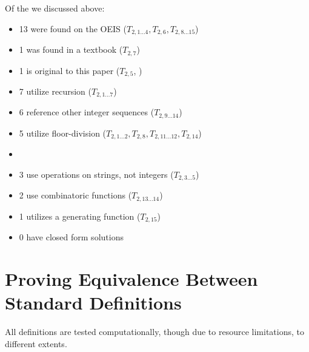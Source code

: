 \documentclass[conference]{IEEEtran}
\begin{document}
Of the \TotalOriginals {} we discussed above:
\begin{itemize}
    \item 13 were found on the OEIS \cite{OEIS-TMS, OEIS-TMS-inv, OEIS-TMS-pos-neg, OEIS-TMS-3-2, OEIS-TMS-inv-plus1} ($T_{2,1\dots4}, T_{2,6}, T_{2,8\dots15}$)
    \item 1 was found in a textbook \cite{Arndt_2010} ($T_{2,7}$)
    \item 1 is  original to this paper ($T_{2,5}$, )
    \\%
    \item 7  utilize recursion ($T_{2,1\dots7}$)
    \item 6 reference other integer sequences ($T_{2,9\dots14}$)
    \item 5 utilize floor-division ($T_{2,1\dots2}, T_{2,8}, T_{2,11\dots12}, T_{2,14}$)
    \item {}
    \item 3 use operations on strings, not integers ($T_{2,3\dots5}$)
    \item 2 use combinatoric functions ($T_{2,13\dots14}$)
    \item 1 utilizes a generating function ($T_{2,15}$)
    \item 0 have closed form solutions
\end{itemize}

\section{Proving Equivalence Between Standard Definitions}

All definitions are tested computationally, though due to resource limitations, to different extents.
\end{document}
